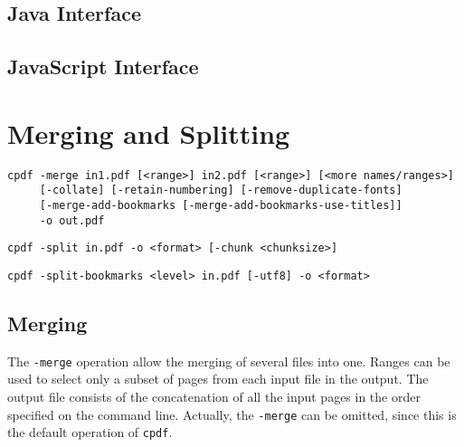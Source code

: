 \documentclass{book}
\newcommand{\cpdf}{\texttt{cpdf}}
\begin{document}
\begin{jcpdflib}
\clearpage
\section*{Java Interface}
\begin{small}\tt




\end{small}
\end{jcpdflib}

\begin{jscpdflib}
\clearpage
\section*{JavaScript Interface}
\begin{small}\tt




\end{small}
\end{jscpdflib}

\chapter{Merging and Splitting}\label{chap:2}
  \begin{framed}
  \small
  \noindent\begin{verbatim}
cpdf -merge in1.pdf [<range>] in2.pdf [<range>] [<more names/ranges>]
     [-collate] [-retain-numbering] [-remove-duplicate-fonts]
     [-merge-add-bookmarks [-merge-add-bookmarks-use-titles]]
     -o out.pdf\end{verbatim}

  \vspace{1.5mm}
  \noindent\verb!cpdf -split in.pdf -o <format> [-chunk <chunksize>]!

  \vspace{1.5mm}
  \noindent\verb!cpdf -split-bookmarks <level> in.pdf [-utf8] -o <format>!
  \end{framed}

  \vspace{12mm}
  \section{Merging}
  The \texttt{-merge} operation allow the merging of several files into one.
Ranges can be used to select only a subset of pages from each
input file in the output. The output file consists of the concatenation of all
the input pages in the order specified on the command line. Actually, the
\texttt{-merge} can be omitted, since this is the default operation of \cpdf.
\end{document}
